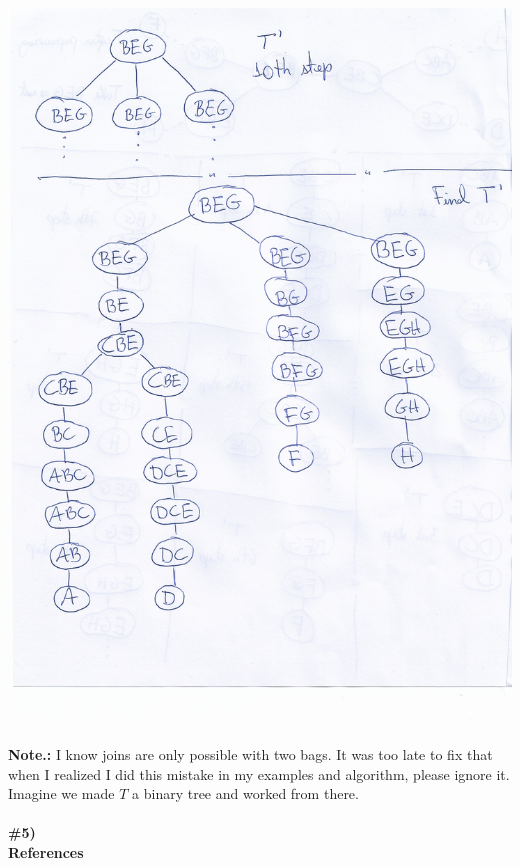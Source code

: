 \documentclass{article}
\begin{document}
\includegraphics[scale=0.7]{2nd_demo_graph_hw3}
\\
\\
\textbf{Note.:} I know joins are only possible with two bags. It was too late to fix that when I realized I did this mistake in my examples and algorithm, please ignore it. Imagine we made $T$ a binary tree and worked from there.
\\
\\
\textbf{\#5)}
\\
\textbf{References}
\\
\end{document}

